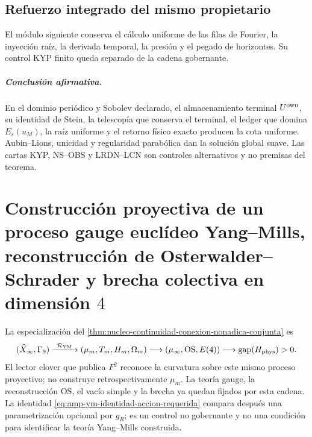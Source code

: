 


\section*{Refuerzo integrado del mismo propietario}

El módulo siguiente conserva el cálculo uniforme de las filas de Fourier,
la inyección raíz, la derivada temporal, la presión y el pegado de
horizontes. Su control KYP finito queda separado de la cadena gobernante.



\paragraph{Conclusión afirmativa.}
En el dominio periódico y Sobolev declarado, el almacenamiento terminal
\(U^{\rm own}\), su identidad de Stein, la telescopía que conserva el
terminal, el ledger que domina \(E_s(u_M)\), la raíz uniforme y el retorno
físico exacto producen la cota uniforme. Aubin--Lions, unicidad y
regularidad parabólica dan la solución global suave. Las cartas KYP,
NS--OBS y LRDN--LCN son controles alternativos y no premisas del teorema.

\chapter[Proceso gauge euclídeo Yang--Mills en dimensión 4]{Construcción
proyectiva de un proceso gauge euclídeo Yang--Mills, reconstrucción de
Osterwalder--Schrader y brecha colectiva en dimensión \(4\)}

\noindent La especialización del
\cref{thm:nucleo-continuidad-conexion-nonadica-conjunta} es
\[
 (\widehat X_\infty,\Gamma_9)
 \xrightarrow{\ \mathcal R_{\rm YM}\ }
 (\mu_m,T_m,H_m,\Omega_m)
 \longrightarrow(\mu_\infty,\mathrm{OS},E(4))
 \longrightarrow\operatorname{gap}(H_{\rm phys})>0.
\]
El lector clover que publica \(F^2\) reconoce la curvatura sobre este mismo
proceso proyectivo; no construye retrospectivamente \(\mu_m\). La teoría
gauge, la reconstrucción OS, el vacío simple y la brecha ya quedan fijados
por esta cadena. La identidad
\eqref{eq:amp-ym-identidad-accion-requerida} compara después una
parametrización opcional por \(g_R\); es un control no gobernante y no una
condición para identificar la teoría Yang--Mills construida.

